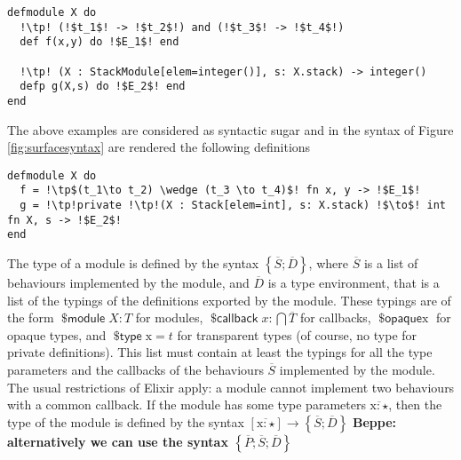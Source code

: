 \documentclass[a4paper,10pt]{article}
\DeclareMathOperator{\kwopq}{\textsf{\$opaque}}
\DeclareMathOperator{\kwtp}{\textsf{\$type}}
\DeclareMathOperator{\kwmdl}{\textsf{\$module}}
\DeclareMathOperator{\kwclbk}{\textsf{\$callback}}
\newcommand{\tx}{\textrm{x}}
\begin{document}
\begin{verbatim}
defmodule X do
  !\tp! (!$t_1$! -> !$t_2$!) and (!$t_3$! -> !$t_4$!)
  def f(x,y) do !$E_1$! end

  !\tp! (X : StackModule[elem=integer()], s: X.stack) -> integer()
  defp g(X,s) do !$E_2$! end
end  
\end{verbatim}
The above examples are considered as syntactic sugar and in the syntax of Figure \ref{fig:surfacesyntax} are rendered the following definitions 
\begin{verbatim}
defmodule X do
  f = !\tp$(t_1\to t_2) \wedge (t_3 \to t_4)$! fn x, y -> !$E_1$!
  g = !\tp!private !\tp!(X : Stack[elem=int], s: X.stack) !$\to$! int fn X, s -> !$E_2$!
end
\end{verbatim}

The type of a module is defined by the syntax $\left\{\overline{S};\overline{D}\right\}$, where $\overline{S}$ is a list of behaviours implemented by the module, and $\overline{D}$ is a type environment, that is a list of the typings of the definitions exported by the module. These typings are of the form $\kwmdl X : T$ for modules, $\kwclbk x : \bigcap \overline{T}$ for callbacks, $\kwopq \tx$ for opaque types, and $\kwtp \tx = t$ for transparent types (of course, no type for private definitions). This list must contain at least the typings for all the type parameters and the callbacks of the behaviours $\overline{S}$ implemented by the module. The usual restrictions of Elixir apply: a module cannot implement two  behaviours with a common callback. If the module has some type parameters $\overline{\tx:\star}$, then the type of the module is defined by the syntax $[\overline{\tx:\star}]\to \left\{\overline{S};\overline{D}\right\}$ \textbf{Beppe: alternatively we can use the syntax $\left\{\overline{P};\overline{S};\overline{D}\right\}$}
\end{document}
